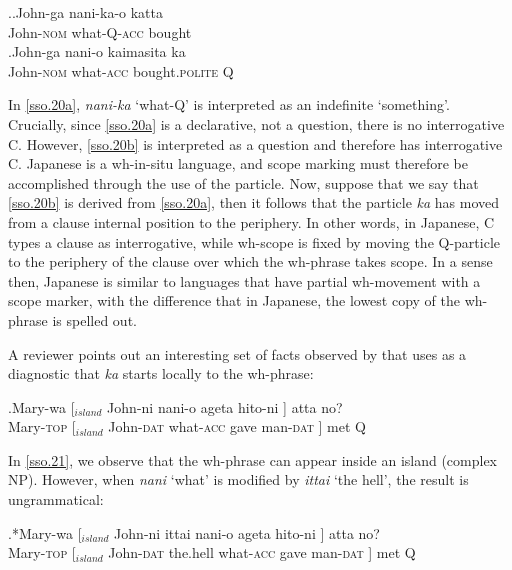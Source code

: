 \documentclass{glossa}
\begin{document}
\ex.\ag.\label{sso.20a}John-ga nani-ka-o katta\\
  John-\textsc{nom} what-Q-\textsc{acc} bought\\
  \bg.\label{sso.20b}John-ga nani-o kaimasita ka\\
  John-\textsc{nom} what-\textsc{acc} bought.\textsc{polite} Q\\

In \ref{sso.20a}, \textit{nani-ka} `what-Q' is interpreted as an indefinite `something'. Crucially, since \ref{sso.20a} is a declarative, not a question, there is no interrogative C. However, \ref{sso.20b} is interpreted as a question and therefore has interrogative C. Japanese is a wh-in-situ language, and scope marking must therefore be accomplished through the use of the particle. Now, suppose that we say that \ref{sso.20b} is derived from \ref{sso.20a}, then it follows that the particle \textit{ka} has moved from a clause internal position to the periphery. In other words, in Japanese, C types a clause as interrogative, while wh-scope is fixed by moving the Q-particle to the periphery of the clause over which the wh-phrase takes scope. In a sense then, Japanese is similar to languages that have partial wh-movement with a scope marker, with the difference that in Japanese, the lowest copy of the wh-phrase is spelled out.

A reviewer points out an interesting set of facts observed by \cite{pesetsky:1987} that \cite{hagstrom:1998} uses as a diagnostic that \textit{ka} starts locally to the wh-phrase:

\exg.\label{sso.21}Mary-wa [$_{island}$ John-ni nani-o ageta hito-ni ] atta no?\\
   Mary-\textsc{top} [$_{island}$ John-\textsc{dat} what-\textsc{acc} gave man-\textsc{dat} ] met Q\\

In \ref{sso.21}, we observe that the wh-phrase can appear inside an island (complex NP). However, when \textit{nani} `what' is modified by \textit{ittai} `the hell', the result is ungrammatical:

\exg.*\label{sso.22}Mary-wa [$_{island}$ John-ni ittai nani-o ageta hito-ni ] atta no?\\
   Mary-\textsc{top} [$_{island}$ John-\textsc{dat} the.hell what-\textsc{acc} gave man-\textsc{dat} ] met Q\\
\end{document}
